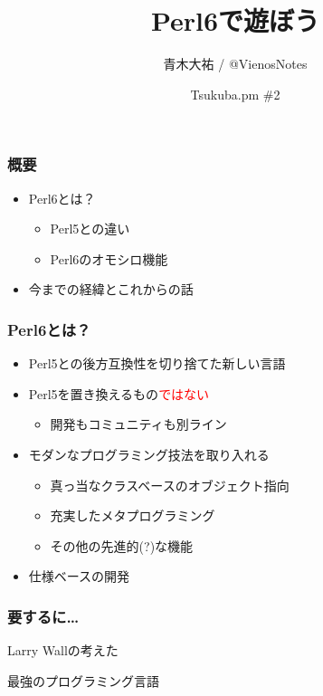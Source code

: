 \documentclass[14pt,dvipdfm,trans]{beamer}
\title{Perl6で遊ぼう}
\author{青木大祐 / @VienosNotes}
\institute{情報科学類}
\date{Tsukuba.pm \#2}
\begin{document}
\frame{\titlepage}
\begin{frame}
 \frametitle{概要}
 \vspace{1zh}
 \begin{itemize}
  \item Perl6とは？
	\vspace{2zh}
	\begin{itemize}
	 \item Perl5との違い
	\vspace{1zh}
	 \item Perl6のオモシロ機能
	\end{itemize}
	\vspace{2zh}
  \item 今までの経緯とこれからの話
	\vspace*{2zh}	
 \end{itemize}
 \vspace{2zh}
\end{frame}

\begin{frame}
 \frametitle{Perl6とは？}

 \begin{itemize}
  \item Perl5との後方互換性を切り捨てた新しい言語
	\vspace*{1zh}
  \item Perl5を置き換えるもの\textcolor{red}{ではない}
	\begin{itemize}
	 \item 開発もコミュニティも別ライン
	\end{itemize}
	\vspace*{1zh}
  \item モダンなプログラミング技法を取り入れる
       \begin{itemize}
	\item 真っ当なクラスベースのオブジェクト指向
	\item 充実したメタプログラミング
	\item その他の先進的(?)な機能
       \end{itemize}
	\vspace*{1zh}
  \item 仕様ベースの開発
 \end{itemize}
\end{frame}

\begin{frame}
 \frametitle{要するに…}
\begin{center}
{\Large
Larry Wallの考えた

最強のプログラミング言語 }
\end{center}
\end{frame}
\end{document}
